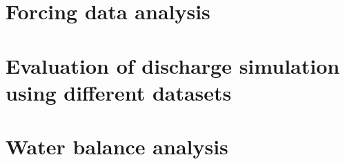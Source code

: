 \label{sec:results}



\section{Forcing data analysis}


\section{Evaluation of discharge simulation using different datasets}


\section{Water balance analysis}
